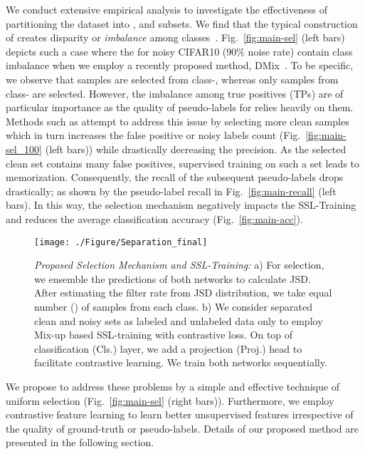 \documentclass[10pt,twocolumn,letterpaper]{article}
\begin{document}
We conduct extensive empirical analysis to investigate the effectiveness of partitioning the dataset into , and  subsets. We find that the typical construction of  creates disparity or \emph{imbalance} among classes~\cite{li2020dividemix,han2018co,yao2021jo}. Fig.~\ref{fig:main-sel} (left bars) depicts such a case where the  for noisy CIFAR10 (90\% noise rate) contain class imbalance when we employ a recently proposed method, DMix~\cite{li2020dividemix}. To be specific, we observe that  samples are selected from class-, whereas only  samples from class- are selected. However, the imbalance among true positives (TPs) are of particular importance as the quality of pseudo-labels for  relies heavily on them. Methods such as  \cite{li2020dividemix} attempt to address this issue by selecting more clean samples which in turn increases the false positive or noisy labels count (Fig.~\ref{fig:main-sel_100} (left bars)) while drastically decreasing the precision. As the selected clean set  contains many false positives, supervised training on such a set leads to memorization. Consequently, the recall of the subsequent pseudo-labels drops drastically; as shown by the pseudo-label recall in Fig.~\ref{fig:main-recall} (left bars).
In this way, the selection mechanism negatively impacts the SSL-Training and reduces the average classification accuracy (Fig.~\ref{fig:main-acc}).

\begin{figure*}[htb]
\centering
\texttt{[image: ./Figure/Separation\_final]}
\vspace{-1mm}
\caption{{\it Proposed Selection Mechanism and SSL-Training:} a) For selection, we ensemble the predictions of both networks to calculate JSD. After estimating the filter rate  from JSD distribution, we take equal number () of samples from each class. b) We consider separated clean and noisy sets as labeled and unlabeled data only to employ Mix-up \cite{zhang2017mixup} based SSL-training with contrastive loss. On top of classification (Cls.) layer, we add a projection (Proj.) head to facilitate contrastive learning. We train both networks sequentially.}

\label{fig:sep}
\vspace{-1mm}
\end{figure*}





We propose to address these problems by a simple and effective technique of uniform selection (Fig.~\ref{fig:main-sel} (right bars)). Furthermore, we employ contrastive feature learning to learn better unsupervised features irrespective of the quality of ground-truth or pseudo-labels. 
Details of our proposed method are presented in the following section.  
\vspace{-1mm}
\end{document}
